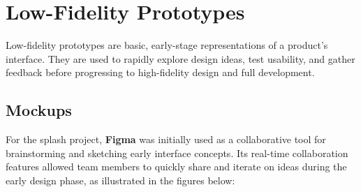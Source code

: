 \chapter{Low-Fidelity Prototypes}
\label{chapter:Mockups}

Low-fidelity prototypes are basic, early-stage representations of a product’s interface. They are used to rapidly explore design ideas, test usability, and gather feedback before progressing to high-fidelity design and full development. \\

\section{Mockups}

For the \ac{splash} project, \textbf{Figma} was initially used as a collaborative tool for brainstorming and sketching early interface concepts. Its real-time collaboration features allowed team members to quickly share and iterate on ideas during the early design phase, as illustrated in the figures below:

